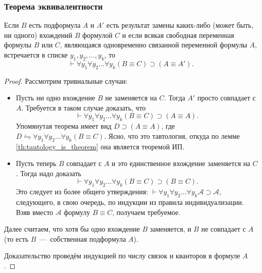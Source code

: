 \subsubsection{Теорема эквивалентности}
\begin{theorem}
    Если $B$ есть подформула $A$ и $A'$ есть результат замены каких-либо (может быть, ни одного) вхождений $B$ формулой $C$ и если всякая свободная переменная формулы $B$ или $C$, являющаяся одновременно связанной переменной формулы $A$, встречается в списке $y_1, y_2, \dots, y_k$, то
    \[
        \vdash \forall y_1\forall y_2\dots\forall y_k(B \equiv C) \supset (A \equiv A').
    \]
\end{theorem}
\begin{proof}
    Рассмотрим тривиальные случаи:
    \begin{itemize}
        \item Пусть ни одно вхождение $B$ не заменяется на $C$. Тогда $A'$ просто совпадает с $A$. Требуется в таком случае доказать, что
        \[
            \vdash \forall y_1\forall y_2\dots\forall y_k(B \equiv C) \supset (A \equiv A).
        \]
        Упомянутая теорема имеет вид $D \supset (A \equiv A)$, где $D \leftrightharpoons \forall y_1\forall y_2\dots\forall y_k(B \equiv C)$. Ясно, что это тавтология, откуда по лемме \ref{th:tautology_is_theorem} она является теоремой ИП.
        
        \item Пусть теперь $B$ совпадает с $A$ и это единственное вхождение заменяется на $C$. Тогда надо доказать
        \[
            \vdash \forall y_1\forall y_2\dots\forall y_k(B \equiv C) \supset (B \equiv C).
        \]
        Это следует из более общего утверждения: $\vdash \forall y_1\forall y_2\dots\forall y_k\mathcal{A} \supset \mathcal{A}$, следующего, в свою очередь, по индукции из правила индивидуализации. Взяв вместо $\mathcal{A}$ формулу $B \equiv C$, получаем требуемое.
    \end{itemize}

    Далее считаем, что хотя бы одно вхождение $B$ заменяется, и $B$ не совпадает с $A$ (то есть $B$~---~собственная подформула $A$).
    
    Доказательство проведём индукцией по числу связок и кванторов в формуле $A$.


\end{proof}
